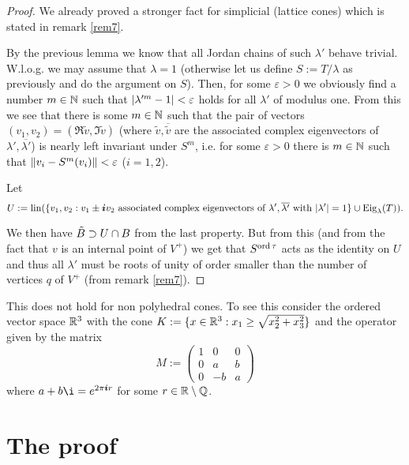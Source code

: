 \documentclass{article}
\begin{document}
\begin{proof}
We already proved a stronger fact for simplicial (lattice cones) which is stated in remark \ref{rem7}. 

By the previous lemma we know that all Jordan chains of such $\lambda'$ behave trivial. W.l.o.g. we may assume that $\lambda=1$ (otherwise let us define $S:=T/\lambda$ as previously and do the argument on $S$). Then, for some $\varepsilon>0$ we obviously find a number $m\in\mathbb{N}$ such that $\left| \lambda'^m-1\right|<\varepsilon$ holds for all $\lambda'$ of modulus one. From this we see that there is some $m\in\mathbb{N}$ such that the pair of vectors $(v_1,v_2)=(\Re{\tilde{v}},\Im{\tilde{v}})$ (where $\tilde{v},\overline{\tilde{v}}$ are the associated complex eigenvectors of $\lambda',\overline{\lambda'}$) is nearly left invariant under $S^m$, i.e. for some $\varepsilon>0$ there is $m\in\mathbb{N}$ such that $\left\Vert v_i-S^m(v_i) \right\Vert<\varepsilon$ ($i=1,2$). 

Let 
\begin{equation}
U:=\operatorname{lin}(\{v_1,v_2:v_1\pm\boldsymbol{i} v_2\text{ associated complex eigenvectors of } \lambda',\overline{\lambda'} \text{ with } |\lambda'|=1\}\cup \operatorname{Eig}_\lambda(T))\text{.}
\end{equation}

 We then have $\tilde{B}\supset U\cap B$ from the last property. But from this (and from the fact that $v$ is an internal point of $V^+$) we get that $S^{\operatorname{ord}\tau}$ acts as the identity on $U$ and thus all $\lambda'$ must be roots of unity of order smaller than the number of vertices $q$ of $V^+$ (from remark \ref{rem7}).
\end{proof}

\begin{remark}
This does not hold for non polyhedral cones. To see this consider the ordered vector space $\mathbb{R}^3$ with the cone $K:=\{x\in\mathbb{R}^3:x_1\geq \sqrt{x_2^2+x_3^2}\}$ and the operator given by the matrix
\begin{equation}
M:=\begin{pmatrix}
1 & 0 & 0 \\
0 & a & b \\
0 & -b & a 
\end{pmatrix}
\end{equation}
where $a+b\i=e^{2\pi\mi r}$ for some $r\in\mathbb{R}\setminus\mathbb{Q}$.
\end{remark}

\section{The proof}
\end{document}
